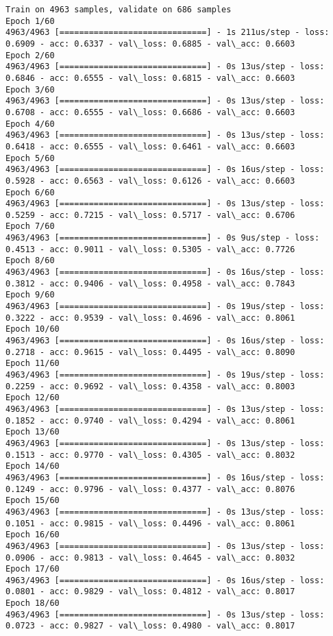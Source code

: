 \documentclass[11pt]{article}
\begin{document}
    \begin{Verbatim}[commandchars=\\\{\}]
Train on 4963 samples, validate on 686 samples
Epoch 1/60
4963/4963 [==============================] - 1s 211us/step - loss: 0.6909 - acc: 0.6337 - val\_loss: 0.6885 - val\_acc: 0.6603
Epoch 2/60
4963/4963 [==============================] - 0s 13us/step - loss: 0.6846 - acc: 0.6555 - val\_loss: 0.6815 - val\_acc: 0.6603
Epoch 3/60
4963/4963 [==============================] - 0s 13us/step - loss: 0.6708 - acc: 0.6555 - val\_loss: 0.6686 - val\_acc: 0.6603
Epoch 4/60
4963/4963 [==============================] - 0s 13us/step - loss: 0.6418 - acc: 0.6555 - val\_loss: 0.6461 - val\_acc: 0.6603
Epoch 5/60
4963/4963 [==============================] - 0s 16us/step - loss: 0.5928 - acc: 0.6563 - val\_loss: 0.6126 - val\_acc: 0.6603
Epoch 6/60
4963/4963 [==============================] - 0s 13us/step - loss: 0.5259 - acc: 0.7215 - val\_loss: 0.5717 - val\_acc: 0.6706
Epoch 7/60
4963/4963 [==============================] - 0s 9us/step - loss: 0.4513 - acc: 0.9011 - val\_loss: 0.5305 - val\_acc: 0.7726
Epoch 8/60
4963/4963 [==============================] - 0s 16us/step - loss: 0.3812 - acc: 0.9406 - val\_loss: 0.4958 - val\_acc: 0.7843
Epoch 9/60
4963/4963 [==============================] - 0s 19us/step - loss: 0.3222 - acc: 0.9539 - val\_loss: 0.4696 - val\_acc: 0.8061
Epoch 10/60
4963/4963 [==============================] - 0s 16us/step - loss: 0.2718 - acc: 0.9615 - val\_loss: 0.4495 - val\_acc: 0.8090
Epoch 11/60
4963/4963 [==============================] - 0s 19us/step - loss: 0.2259 - acc: 0.9692 - val\_loss: 0.4358 - val\_acc: 0.8003
Epoch 12/60
4963/4963 [==============================] - 0s 13us/step - loss: 0.1852 - acc: 0.9740 - val\_loss: 0.4294 - val\_acc: 0.8061
Epoch 13/60
4963/4963 [==============================] - 0s 13us/step - loss: 0.1513 - acc: 0.9770 - val\_loss: 0.4305 - val\_acc: 0.8032
Epoch 14/60
4963/4963 [==============================] - 0s 16us/step - loss: 0.1249 - acc: 0.9796 - val\_loss: 0.4377 - val\_acc: 0.8076
Epoch 15/60
4963/4963 [==============================] - 0s 13us/step - loss: 0.1051 - acc: 0.9815 - val\_loss: 0.4496 - val\_acc: 0.8061
Epoch 16/60
4963/4963 [==============================] - 0s 13us/step - loss: 0.0906 - acc: 0.9813 - val\_loss: 0.4645 - val\_acc: 0.8032
Epoch 17/60
4963/4963 [==============================] - 0s 16us/step - loss: 0.0801 - acc: 0.9829 - val\_loss: 0.4812 - val\_acc: 0.8017
Epoch 18/60
4963/4963 [==============================] - 0s 13us/step - loss: 0.0723 - acc: 0.9827 - val\_loss: 0.4980 - val\_acc: 0.8017

\end{Verbatim}
\end{document}
